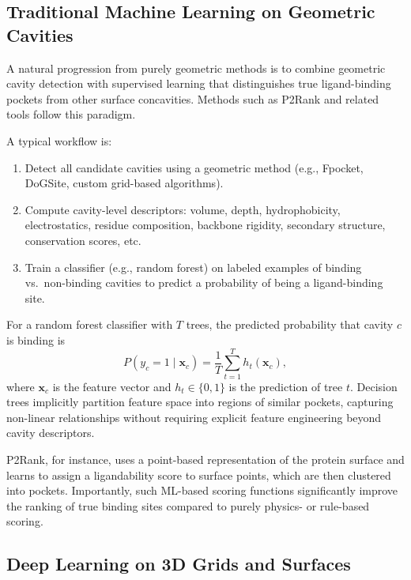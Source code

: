 \documentclass[12pt,a4paper]{article}
\begin{document}
\subsection{Traditional Machine Learning on Geometric Cavities}

A natural progression from purely geometric methods is to combine geometric cavity detection with supervised learning that distinguishes true ligand-binding pockets from other surface concavities. Methods such as P2Rank and related tools follow this paradigm.\cite{CH5_Krivak2018,CH5_zhao2020exploring}

A typical workflow is:
\begin{enumerate}
    \item Detect all candidate cavities using a geometric method (e.g., Fpocket, DoGSite, custom grid-based algorithms).
    \item Compute cavity-level descriptors: volume, depth, hydrophobicity, electrostatics, residue composition, backbone rigidity, secondary structure, conservation scores, etc.
    \item Train a classifier (e.g., random forest) on labeled examples of binding vs.\ non-binding cavities to predict a probability of being a ligand-binding site.
\end{enumerate}

For a random forest classifier with \(T\) trees, the predicted probability that cavity \(c\) is binding is
\begin{equation}
P(y_c = 1 \mid \mathbf{x}_c) = \frac{1}{T} \sum_{t=1}^T h_t(\mathbf{x}_c),
\label{eq:rf_probability}
\end{equation}
where \(\mathbf{x}_c\) is the feature vector and \(h_t \in \{0,1\}\) is the prediction of tree \(t\). Decision trees implicitly partition feature space into regions of similar pockets, capturing non-linear relationships without requiring explicit feature engineering beyond cavity descriptors.

P2Rank, for instance, uses a point-based representation of the protein surface and learns to assign a ligandability score to surface points, which are then clustered into pockets.\cite{CH5_Krivak2018} Importantly, such ML-based scoring functions significantly improve the ranking of true binding sites compared to purely physics- or rule-based scoring.\cite{CH5_zhao2020exploring,CH5_ghersi2011beyond}

\subsection{Deep Learning on 3D Grids and Surfaces}
\end{document}

